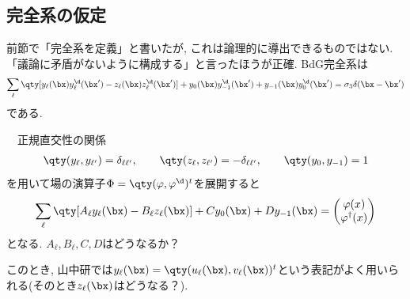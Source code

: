 \documentclass[10.5pt,a4paper]{jreport}
\begin{document}
\subsection{完全系の仮定}
前節で「完全系を定義」と書いたが, これは論理的に導出できるものではない. 「議論に矛盾がないように構成する」と言ったほうが正確. BdG完全系は
\begin{eqnarray}
  \sum_{\ell}\qty[y_{\ell}(\bx)y^\d_{\ell}(\bx') - z_{\ell}(\bx)z^\d_{\ell}(\bx')] + y_{0}(\bx)y^\d_{-1}(\bx') + y_{-1}(\bx)y^\d_{0}(\bx')  = \sigma_3\delta(\bx - \bx')\label{completeness2}\\
\end{eqnarray}
である. 
\begin{screen}
\ \ 正規直交性の関係
\begin{eqnarray}
  \qty(y_{\ell}, y_{\ell'}) = \delta_{\ell\ell'}, \hspace{0.7cm}\qty(z_{\ell}, z_{\ell'}) = -\delta_{\ell\ell'}, \hspace{0.7cm}\qty(y_{0}, y_{-1}) = 1
\end{eqnarray}
を用いて場の演算子$\Phi = \qty(\varphi, \varphi^\d)^t$を展開すると
\begin{eqnarray}
  \sum_{\ell}\qty[A_\ell y_{\ell}(\bx) - B_\ell z_{\ell}(\bx)] + Cy_{0}(\bx) + Dy_{-1}(\bx)  =
  \begin{pmatrix}
    \varphi(x)\\
    \varphi^\dagger(x)
  \end{pmatrix}
\end{eqnarray}
となる. $A_\ell , B_\ell , C, D$はどうなるか？
\end{screen}
このとき, 山中研では$y_\ell(\bx) = \qty(u_\ell (\bx), v_\ell (\bx))^t$という表記がよく用いられる(そのとき$z_\ell(\bx)$はどうなる？).
\end{document}
